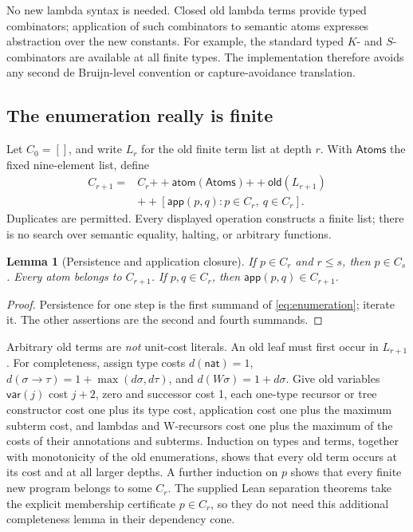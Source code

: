 \documentclass[11pt]{article}
\newtheorem{lemma}[theorem]{Lemma}
\theoremstyle{definition}
\theoremstyle{remark}
\begin{document}
No new lambda syntax is needed. Closed old lambda terms provide typed
combinators; application of such combinators to semantic atoms expresses
abstraction over the new constants. For example, the standard typed
$K$- and $S$-combinators are available at all finite types. The implementation
therefore avoids any second de Bruijn-level convention or capture-avoidance
translation.

\subsection{The enumeration really is finite}

Let $C_0=[]$, and write $L_r$ for the old finite term list at depth $r$.
With $\mathsf{Atoms}$ the fixed nine-element list, define
\begin{equation}\label{eq:enumeration}
\begin{split}
 C_{r+1}={}&C_r\mathbin{+\!+}\mathsf{atom}(\mathsf{Atoms})
 \mathbin{+\!+}\mathsf{old}(L_{r+1})\\
 &\mathbin{+\!+}
 [\mathsf{app}(p,q):p\in C_r,\ q\in C_r].
\end{split}
\end{equation}
Duplicates are permitted. Every displayed operation constructs a finite
list; there is no search over semantic equality, halting, or arbitrary
functions.

\begin{lemma}[Persistence and application closure]\label{lem:enumeration}
If $p\in C_r$ and $r\le s$, then $p\in C_s$. Every atom belongs to $C_{r+1}$.
If $p,q\in C_r$, then $\mathsf{app}(p,q)\in C_{r+1}$.
\end{lemma}
\begin{proof}
Persistence for one step is the first summand of
\eqref{eq:enumeration}; iterate it. The other assertions are the second and
fourth summands.
\end{proof}

Arbitrary old terms are \emph{not} unit-cost literals. An old leaf must first
occur in $L_{r+1}$. For completeness, assign type costs
$d(\mathsf{nat})=1$, $d(\sigma\to\tau)=1+\max(d\sigma,d\tau)$, and
$d(W\sigma)=1+d\sigma$. Give old variables $\mathsf{var}(j)$ cost $j+2$,
zero and successor cost 1, each one-type recursor or tree constructor cost
one plus its type cost, application cost one plus the maximum subterm cost,
and lambdas and W-recursors cost one plus the maximum of the costs of their
annotations and subterms. Induction on types and terms, together with
monotonicity of the old enumerations, shows that every old term occurs at its
cost and at all larger depths. A further induction on $p$ shows that every
finite new program belongs to some $C_r$. The supplied Lean separation
theorems take the explicit membership certificate $p\in C_r$, so they do not
need this additional completeness lemma in their dependency cone.
\end{document}
